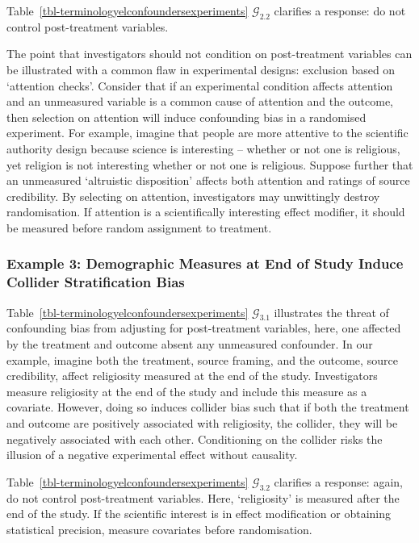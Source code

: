 \documentclass[
  single column]{article}
\begin{document}
Table~\ref{tbl-terminologyelconfoundersexperiments}
\(\mathcal{G}_{2.2}\) clarifies a response: do not control
post-treatment variables.

The point that investigators should not condition on post-treatment
variables can be illustrated with a common flaw in experimental designs:
exclusion based on `attention checks'. Consider that if an experimental
condition affects attention and an unmeasured variable is a common cause
of attention and the outcome, then selection on attention will induce
confounding bias in a randomised experiment. For example, imagine that
people are more attentive to the scientific authority design because
science is interesting -- whether or not one is religious, yet religion
is not interesting whether or not one is religious. Suppose further that
an unmeasured `altruistic disposition' affects both attention and
ratings of source credibility. By selecting on attention, investigators
may unwittingly destroy randomisation. If attention is a scientifically
interesting effect modifier, it should be measured before random
assignment to treatment.

\subsubsection{Example 3: Demographic Measures at End of Study Induce
Collider Stratification
Bias}\label{example-3-demographic-measures-at-end-of-study-induce-collider-stratification-bias}

Table~\ref{tbl-terminologyelconfoundersexperiments}
\(\mathcal{G}_{3.1}\) illustrates the threat of confounding bias from
adjusting for post-treatment variables, here, one affected by the
treatment and outcome absent any unmeasured confounder. In our example,
imagine both the treatment, source framing, and the outcome, source
credibility, affect religiosity measured at the end of the study.
Investigators measure religiosity at the end of the study and include
this measure as a covariate. However, doing so induces collider bias
such that if both the treatment and outcome are positively associated
with religiosity, the collider, they will be negatively associated with
each other. Conditioning on the collider risks the illusion of a
negative experimental effect without causality.

Table~\ref{tbl-terminologyelconfoundersexperiments}
\(\mathcal{G}_{3.2}\) clarifies a response: again, do not control
post-treatment variables. Here, `religiosity' is measured after the end
of the study. If the scientific interest is in effect modification or
obtaining statistical precision, measure covariates before
randomisation.
\end{document}
